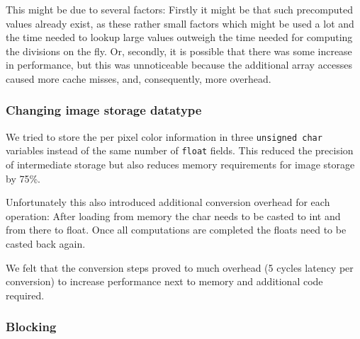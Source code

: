 %
%

This might be due to several factors:
Firstly it might be that such precomputed values already exist, as these rather small factors which might be used a lot and the time needed to lookup large values outweigh the time needed for computing the divisions on the fly. Or, secondly, it is possible that there was some increase in performance, but this was unnoticeable because the additional array accesses caused more cache misses, and, consequently, more overhead.

\subsubsection{Changing image storage datatype}

We tried to store the per pixel color information in three \texttt{unsigned char} variables instead of the same number of \texttt{float} fields. This reduced the precision of intermediate storage but also reduces memory requirements for image storage by 75\%.
 
Unfortunately this also introduced additional conversion overhead for each operation: After loading from memory the char needs to be casted to int and from there to float. Once all computations are completed the floats need to be casted back again. 

We felt that the conversion steps proved to much overhead (5 cycles latency per conversion) to increase performance next to memory and additional code required.

\subsubsection{Blocking}

